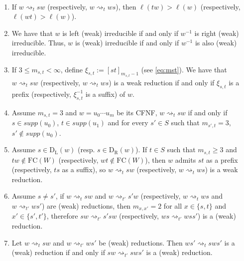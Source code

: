 \documentclass[10pt,a4paper]{amsart}
\newcommand{\fc}{{\mathrm{FC}}}
\newcommand{\ld}{{\mathrm{D}_{\mathrm{L}}}}
\newcommand{\rd}{{\mathrm{D}_{\mathrm{R}}}}
\newcommand{\red}{\rightsquigarrow}
\begin{document}
\begin{Remark}\
\label{oss}

\begin{enumerate}
    \item[(1)] If $w\red_t sw$ (respectively, $w\red_t ws$), then $\ell(tw)>\ell(w)$ (respectively, $\ell(wt)>\ell(w)$).%
    \item[(2)] We have that $w$ is left (weak) irreducible if and only if $w^{-1}$ is right (weak) irreducible. Thus, $w$ is (weak) irreducible if and only if $w^{-1}$ is also (weak) irreducible.
    \item[(3)] If $3\le m_{s,t}<\infty$, define $\xi_{s,t} := [st]_{m_{s,t}-1}$ (see \eqref{eq:mst}). We have that $w\red_t sw$ (respectively, $w\red_t ws$) is a weak reduction if and only if $\xi_{s,t}$ is a prefix (respectively, $\xi_{s,t}^{-1}$ is a suffix) of $w$.    
    \item[(4)] Assume $m_{s,t}=3$ and $w=u_0\cdots u_m$ be its CFNF, $w\red_t sw$ if and only if $s\in supp(u_0)$, $t\in supp(u_1)$ and for every $s'\in S$ such that $m_{s',t}= 3$, $s'\notin supp(u_0)$. 
    \item[(5)] Assume $s\in \ld(w)$ (resp. $s\in \rd(w)$). If $t\in S$ such that $m_{s,t}\ge 3$ and $tw\notin \fc(W)$ (respectively, $wt\notin \fc(W)$), then $w$ admits $st$ as a prefix (respectively, $ts$ as a suffix), so $w\red_t sw$ (respectively, $w\red_t ws$) is a weak reduction. 
    \item[(6)] Assume $s\ne s'$, if $w\red_t sw$ and $w\red_{t'} s'w$ (respectively, $w\red_t ws$ and $w\red_{t'} ws'$) are (weak) reductions, then $m_{x,x'}=2$ for all $x\in \{s,t\}$ and $x'\in \{s',t'\}$, therefore $sw\red_{t'} s'sw$ (respectively, $ws \red_{t'} wss'$) is a (weak) reduction. 
    \item[(7)] %
    Let $w\red_t sw$ and $w\red_{t'} ws'$ be (weak) reductions. Then $ws'\red_t sws'$  is a (weak) reduction if and only if $sw \red_{t'} sws'$ is a (weak) reduction. 
\end{enumerate}
\end{Remark}
\end{document}
